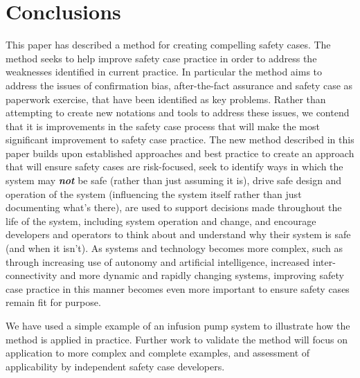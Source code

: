\section{Conclusions}
\label{sec:conclusions}

This paper has described a method for creating compelling safety cases. The method seeks to help improve safety case practice in order to address the weaknesses identified in current practice. In particular the method aims to address the issues of confirmation bias, after-the-fact assurance and safety case as paperwork exercise, that have been identified as key problems. Rather than attempting to create new notations and tools to address these issues, we contend that it is improvements in the safety case process that will make the most significant improvement to safety case practice. The new method described in this paper builds upon established approaches and best practice to create an approach that will ensure safety cases are risk-focused, seek to identify ways in which the system may \textbf{\textit{not}} be safe (rather than just assuming it is), drive safe design and operation of the system (influencing the system itself rather than just documenting what's there), are used to support decisions made throughout the life of the system, including system operation and change, and encourage developers and operators to think about and understand why their system is safe (and when it isn't). As systems and technology becomes more complex, such as through increasing use of autonomy and artificial intelligence, increased inter-connectivity and more dynamic and rapidly changing systems, improving safety case practice in this manner becomes even more important to ensure safety cases remain fit for purpose.

We have used a simple example of an infusion pump system to illustrate how the method is applied in practice. Further work to validate the method will focus on application to more complex and complete examples, and assessment of applicability by independent safety case developers.


